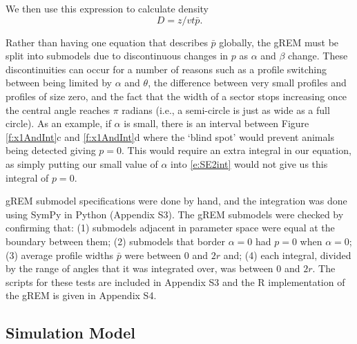 We then use this expression to calculate density
\begin{equation}
\label{e:gas}
D = z/vt\bar{p}.
\end{equation}


Rather than having one equation that describes $\bar{p}$ globally, the gREM must be split into submodels due to discontinuous changes in $p$ as $\alpha$ and $\beta$ change.
These discontinuities can occur for a number of reasons such as a profile switching between being limited by $\alpha$ and $\theta$, the difference between very small profiles and profiles of size zero, and the fact that the width of a sector stops increasing once the central angle reaches $\pi$ radians (i.e., a semi-circle is just as wide as a full circle).
As an example, if $\alpha$ is small, there is an interval between Figure \ref{f:x1AndInt}c and \ref{f:x1AndInt}d where the `blind spot' would prevent animals being detected giving $p=0$.
This would require an extra integral in our equation, as simply putting our small value of $\alpha$ into \ref{e:SE2int} would not give us this integral of $p=0$.

gREM submodel specifications were done by hand, and the integration was done using SymPy \cite{sympy} in Python (Appendix S3).
The gREM submodels were checked by confirming that: (1) submodels adjacent in parameter space were equal at the boundary between them; (2) submodels that border $ \alpha = 0$ had $p = 0$ when $ \alpha = 0$; (3) average profile widths $\bar{p}$ were between 0 and $2r$ and; (4) each integral, divided by the range of angles that it was integrated over, was between 0 and $2r$.
The scripts for these tests are included in Appendix S3 and the R \cite{R} implementation of the gREM is given in Appendix S4.  

\subsection{Simulation Model}

